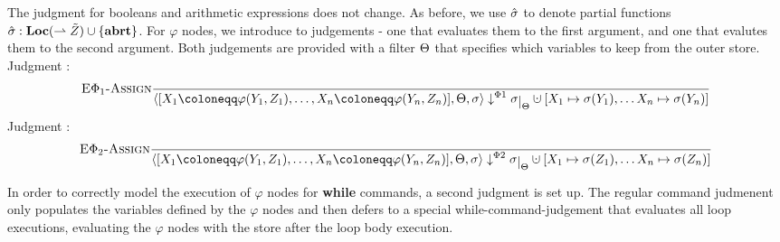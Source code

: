 The judgment for booleans and arithmetic expressions does not change.
As before, we use $\hat{\sigma}{}$ to denote partial functions
$\hat{\sigma}{}: \textbf{Loc} (\rightharpoonup \tilde{Z}) \cup \{\textbf{abrt}\}$.
For $\varphi$ nodes, we introduce to judgements - one that evaluates them to the first argument,
and one that evalutes them to the second argument.
Both judgements are provided with a filter $\Theta$ that specifies which variables 
to keep from the outer store.
\\
Judgment :
\begin{align*}
    &\bsrule{E$\Phi_1$-Assign}{}
    {\bigsteppl{\defaultphilistn}{\filter}{\store}{\storeassign{\store\restrict{\filter}}{X_1 \mapsto \store(Y_1),\ldots X_n \mapsto \store(Y_n)}}}\\
\end{align*}
Judgment :
\begin{align*}
    &\bsrule{E$\Phi_2$-Assign}{}
    {\bigsteppr{\defaultphilistn}{\filter}{\store}{\storeassign{\store\restrict{\filter}}{X_1 \mapsto \store(Z_1),\ldots X_n \mapsto \store(Z_n)}}}\\
\end{align*}

In order to correctly model the execution of $\varphi$ nodes for \textbf{while} commands,
a second judgment is set up.
The regular command judmenent only populates the variables defined by the $\varphi$ nodes
and then defers to a special while-command-judgement that evaluates all loop executions,
evaluating the $\varphi$ nodes with the store after the loop body execution.


